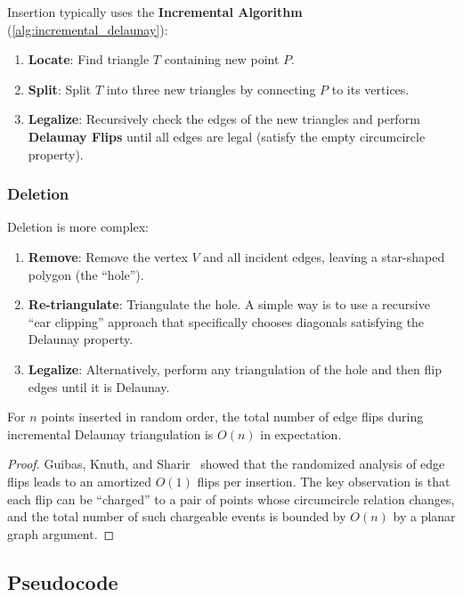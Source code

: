 Insertion typically uses the \textbf{Incremental Algorithm} (\cref{alg:incremental_delaunay}):
\begin{enumerate}
\item \textbf{Locate}: Find triangle $T$ containing new point $P$.
\item \textbf{Split}: Split $T$ into three new triangles by connecting $P$ to its vertices.
\item \textbf{Legalize}: Recursively check the edges of the new triangles and perform \textbf{Delaunay Flips} until all edges are legal (satisfy the empty circumcircle property).
\end{enumerate}

\subsubsection*{Deletion}

Deletion is more complex:
\begin{enumerate}
\item \textbf{Remove}: Remove the vertex $V$ and all incident edges, leaving a star-shaped polygon (the ``hole'').
\item \textbf{Re-triangulate}: Triangulate the hole. A simple way is to use a recursive ``ear clipping'' approach that specifically chooses diagonals satisfying the Delaunay property.
\item \textbf{Legalize}: Alternatively, perform any triangulation of the hole and then flip edges until it is Delaunay.
\end{enumerate}

\begin{theorem}\label{thm:expected_flips}
For $n$ points inserted in random order, the total number of edge flips during incremental Delaunay triangulation is $O(n)$ in expectation.
\end{theorem}
\begin{proof}
Guibas, Knuth, and Sharir~\cite{guibas1985} showed that the randomized analysis of edge flips leads to an amortized $O(1)$ flips per insertion. The key observation is that each flip can be ``charged'' to a pair of points whose circumcircle relation changes, and the total number of such chargeable events is bounded by $O(n)$ by a planar graph argument.
\end{proof}

\subsection{Pseudocode}

